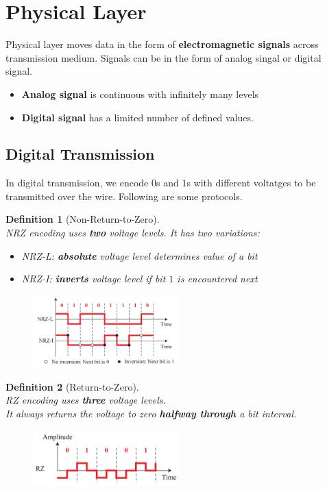 \documentclass[12pt]{article}
\newtheorem{definition}{Definition}[section]
\theoremstyle{definition}
\begin{document}
\section{Physical Layer}
Physical layer moves data in the form of \textbf{electromagnetic signals} across transmission medium. Signals can be in the form of analog singal or digital signal.
\begin{itemize}
  \item \textbf{Analog signal} is continuous with infinitely many levels
  \item \textbf{Digital signal} has a limited number of defined values.
\end{itemize}
\subsection{Digital Transmission}
In digital transmission, we encode $0$s and $1$s with different voltatges to be transmitted over the wire. Following are some protocols.
\begin{definition}[Non-Return-to-Zero]
\hfill\\\normalfont NRZ encoding uses \textbf{two} voltage levels. It has two variations:
\begin{itemize}
  \item NRZ-L: \textbf{absolute} voltage level determines value of a bit
  \item NRZ-I: \textbf{inverts} voltage level if bit $1$ is encountered next
\end{itemize}
\begin{figure}[h]
\centering
\includegraphics[width = 0.5\textwidth]{10_1_1.png}
\end{figure}
\end{definition}
\begin{definition}[Return-to-Zero]
\hfill\\\normalfont RZ encoding uses \textbf{three} voltage levels.\\It \textit{always} returns the voltage to zero \textbf{halfway through} a bit interval.
\begin{figure}[h]
\centering
\includegraphics[width = 0.5\textwidth]{10_1_2.png}
\end{figure}
\end{definition}
\end{document}
